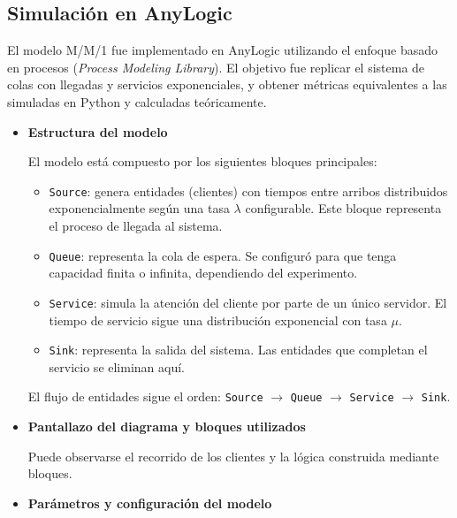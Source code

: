 \documentclass[12pt]{article}
\begin{document}
\subsection{Simulación en AnyLogic}

El modelo M/M/1 fue implementado en AnyLogic utilizando el enfoque basado en procesos (\textit{Process Modeling Library}). El objetivo fue replicar el sistema de colas con llegadas y servicios exponenciales, y obtener métricas equivalentes a las simuladas en Python y calculadas teóricamente.

\begin{itemize}
    \item \textbf{Estructura del modelo}

    El modelo está compuesto por los siguientes bloques principales:

    \begin{itemize}
        \item \texttt{Source}: genera entidades (clientes) con tiempos entre arribos distribuidos exponencialmente según una tasa $\lambda$ configurable. Este bloque representa el proceso de llegada al sistema.
        \item \texttt{Queue}: representa la cola de espera. Se configuró para que tenga capacidad finita o infinita, dependiendo del experimento.
        \item \texttt{Service}: simula la atención del cliente por parte de un único servidor. El tiempo de servicio sigue una distribución exponencial con tasa $\mu$.
        \item \texttt{Sink}: representa la salida del sistema. Las entidades que completan el servicio se eliminan aquí.
    \end{itemize}

    El flujo de entidades sigue el orden: \texttt{Source} $\rightarrow$ \texttt{Queue} $\rightarrow$ \texttt{Service} $\rightarrow$ \texttt{Sink}.

    \item \textbf{Pantallazo del diagrama y bloques utilizados}


    Puede observarse el recorrido de los clientes y la lógica construida mediante bloques.

    \item \textbf{Parámetros y configuración del modelo}


\end{itemize}
\end{document}
